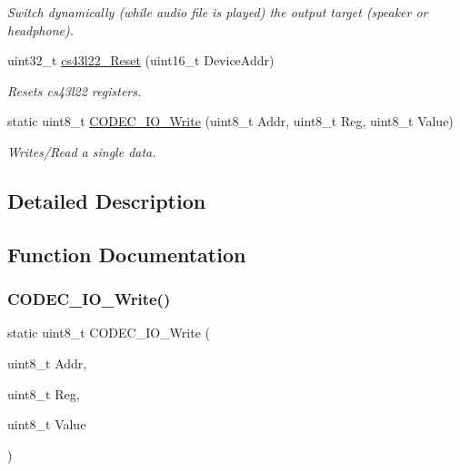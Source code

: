 \begin{DoxyCompactItemize}
\begin{DoxyCompactList}\small\item\em Switch dynamically (while audio file is played) the output target (speaker or headphone). \end{DoxyCompactList}\item 
uint32\+\_\+t \mbox{\hyperlink{group___c_s43_l22___private___functions_ga647488feb466972a5557a2fe2e9350e7}{cs43l22\+\_\+\+Reset}} (uint16\+\_\+t Device\+Addr)
\begin{DoxyCompactList}\small\item\em Resets cs43l22 registers. \end{DoxyCompactList}\item 
static uint8\+\_\+t \mbox{\hyperlink{group___c_s43_l22___private___functions_ga99f26b128211af21a6818504a33cf25c}{C\+O\+D\+E\+C\+\_\+\+I\+O\+\_\+\+Write}} (uint8\+\_\+t Addr, uint8\+\_\+t Reg, uint8\+\_\+t Value)
\begin{DoxyCompactList}\small\item\em Writes/\+Read a single data. \end{DoxyCompactList}\end{DoxyCompactItemize}


\subsection{Detailed Description}


\subsection{Function Documentation}
\mbox{\label{group___c_s43_l22___private___functions_ga99f26b128211af21a6818504a33cf25c}} 
\subsubsection{\texorpdfstring{C\+O\+D\+E\+C\+\_\+\+I\+O\+\_\+\+Write()}{CODEC\_IO\_Write()}}
{\footnotesize\ttfamily static uint8\+\_\+t C\+O\+D\+E\+C\+\_\+\+I\+O\+\_\+\+Write (\begin{DoxyParamCaption}\item[{uint8\+\_\+t}]{Addr,  }\item[{uint8\+\_\+t}]{Reg,  }\item[{uint8\+\_\+t}]{Value }\end{DoxyParamCaption})\hspace{0.3cm}{\ttfamily [static]}}



